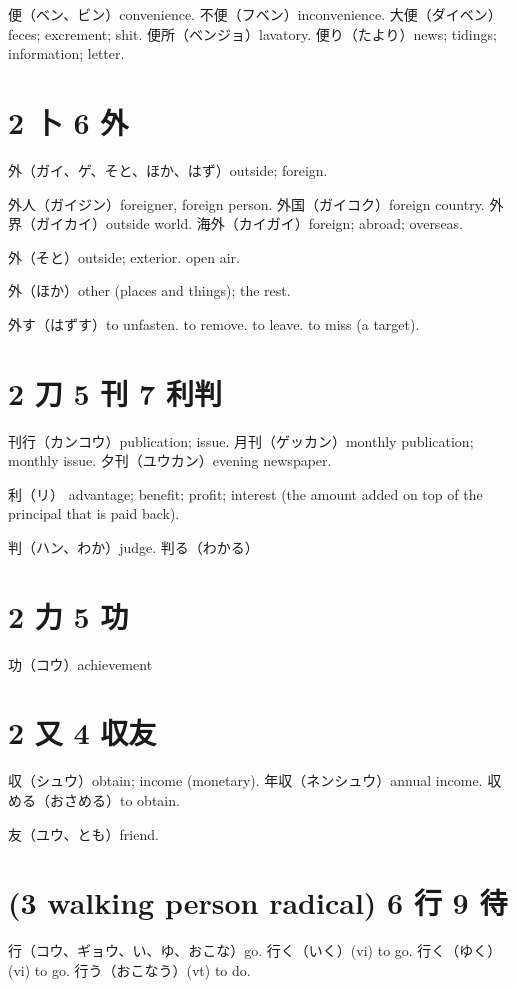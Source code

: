 便（ベン、ビン）convenience.
不便（フベン）inconvenience.
大便（ダイベン）feces; excrement; shit.
便所（ベンジョ）lavatory.
便り（たより）news; tidings; information; letter.

\section{2 卜 6 外}

外（ガイ、ゲ、そと、ほか、はず）outside; foreign.

外人（ガイジン）foreigner, foreign person.
外国（ガイコク）foreign country.
外界（ガイカイ）outside world.
海外（カイガイ）foreign; abroad; overseas.

外（そと）outside; exterior. open air.

外（ほか）other (places and things); the rest.

外す（はずす）to unfasten. to remove. to leave. to miss (a target).

\section{2 刀 5 刊 7 利判}

刊行（カンコウ）publication; issue.
月刊（ゲッカン）monthly publication; monthly issue.
夕刊（ユウカン）evening newspaper.

利（リ）
advantage; benefit; profit;
interest (the amount added on top of the principal that is paid back).

判（ハン、わか）judge.
判る（わかる）

\section{2 力 5 功}

功（コウ）achievement

\section{2 又 4 収友}

収（シュウ）obtain; income (monetary).
年収（ネンシュウ）annual income.
収める（おさめる）to obtain.

友（ユウ、とも）friend.

\section{(3 walking person radical) 6 行 9 待}

行（コウ、ギョウ、い、ゆ、おこな）go.
行く（いく）(vi) to go.
行く（ゆく）(vi) to go.
行う（おこなう）(vt) to do.

